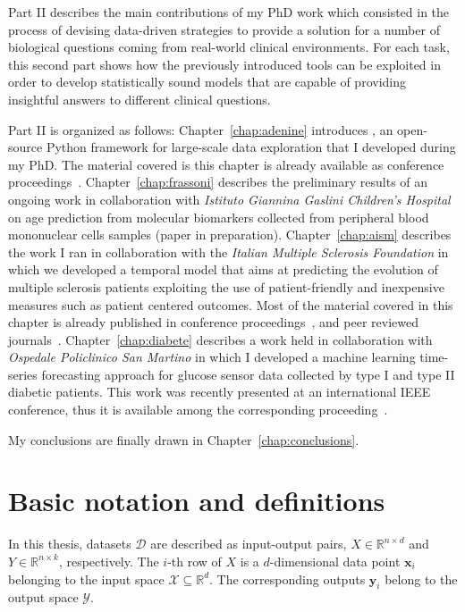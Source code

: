 Part II describes the main contributions of my PhD work which consisted in the process of devising data-driven strategies to provide a solution for a number of biological questions coming from real-world clinical environments. For each task, this second part shows how the previously introduced tools can be exploited in order to develop statistically sound models that are capable of providing insightful answers to different clinical questions.

Part II is organized as follows:
Chapter~\ref{chap:adenine} introduces \ade, an open-source Python framework for large-scale data exploration that I developed during my PhD.
The material covered is this chapter is already available as conference proceedings~\cite{fiorini2017adenine}.
Chapter~\ref{chap:frassoni} describes the preliminary results of an ongoing work in collaboration with \textit{Istituto Giannina Gaslini Children's Hospital} on age prediction from molecular biomarkers collected from peripheral blood mononuclear cells samples (paper in preparation).
Chapter~\ref{chap:aism} describes the work I ran in collaboration with the \textit{Italian Multiple Sclerosis Foundation} in which we developed a temporal model that aims at predicting the evolution of multiple sclerosis patients exploiting the use of patient-friendly and inexpensive measures such as patient centered outcomes.
Most of the material covered in this chapter is already published in conference proceedings~\cite{fiorini2015machine}, and peer reviewed journals~\cite{brichetto2015improving, fiorini2016temporal, brichetto2016predicting, pmlr-v68-fiorini17a, tacchino2017multiple}.
Chapter~\ref{chap:diabete} describes a work held in collaboration with \textit{Ospedale Policlinico San Martino} in which I developed a machine learning time-series forecasting approach for glucose sensor data collected by type I and type II diabetic patients.
This work was recently presented at an international IEEE conference, thus it is available among the corresponding proceeding~\cite{fiorini2017data}.

My conclusions are finally drawn in Chapter~\ref{chap:conclusions}.

\chapter{Basic notation and definitions} \label{sec:notation}
In this thesis, datasets $\mathcal{D}$ are described as input-output pairs, $X \in \mathbb{R}^{n \times d}$ and $Y \in \mathbb{R}^{n \times k}$, respectively.
The $i$-th row of $X$ is a $d$-dimensional data point $\bm{x}_{i}$ belonging to the input space $\mathcal{X}\subseteq\mathds{R}^d$. The corresponding outputs $\bm{y}_{i}$ belong to the output space $\mathcal{Y}$.

